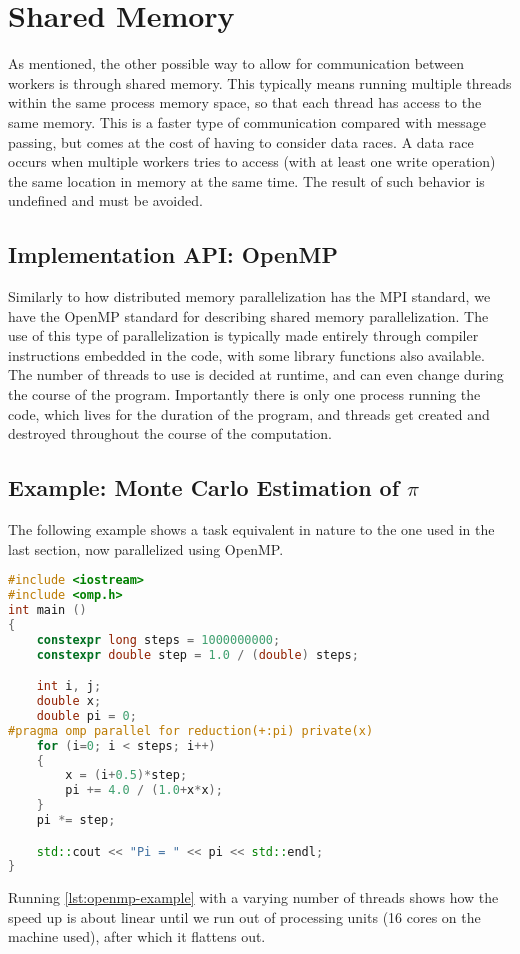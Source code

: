 \documentclass[Thesis.tex]{subfiles}
\begin{document}
\section{Shared Memory}

As mentioned, the other possible way to allow for communication between workers
is through shared memory. This typically means running multiple threads within
the same process memory space, so that each thread has access to the same
memory. This is a faster type of communication compared with message passing,
but comes at the cost of having to consider data races. A data race occurs when
multiple workers tries to access (with at least one write operation) the same
location in memory at the same time. The result of such behavior is undefined
and must be avoided.

\subsection{Implementation API: OpenMP}

Similarly to how distributed memory parallelization has the MPI standard, we
have the OpenMP standard for describing shared memory parallelization. The use
of this type of parallelization is typically made entirely through compiler
instructions embedded in the code, with some library functions also available.
The number of threads to use is decided at runtime, and can even change during
the course of the program. Importantly there is only one process running the
code, which lives for the duration of the program, and threads get
created and destroyed throughout the course of the computation.

\subsection{Example: Monte Carlo Estimation of $\pi$}
The following example shows a task equivalent in nature to
the one used in the last section, now parallelized using OpenMP.

\begin{center}
\begin{lstlisting}[language=C++, caption={Example of parallel estimation of $\pi$ using OpenMP.}, label={lst:openmp-example}]
#include <iostream>
#include <omp.h>
int main ()
{
    constexpr long steps = 1000000000;
    constexpr double step = 1.0 / (double) steps;

    int i, j;
    double x;
    double pi = 0;
#pragma omp parallel for reduction(+:pi) private(x)
    for (i=0; i < steps; i++)
    {
        x = (i+0.5)*step;
        pi += 4.0 / (1.0+x*x);
    }
    pi *= step;

    std::cout << "Pi = " << pi << std::endl;
}
\end{lstlisting}
\end{center}
Running \cref{lst:openmp-example} with a varying number of threads shows how the
speed up is about linear until we run out of processing units (16 cores on the
machine used), after which it flattens out.
\end{document}
